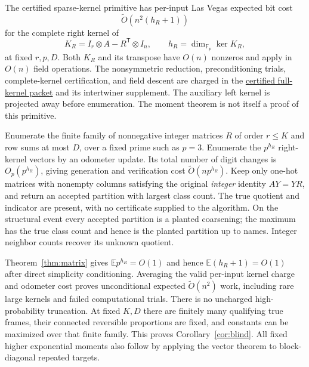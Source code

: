 \documentclass[11pt]{article}
\newcommand{\Fp}{\mathbb F_p}
\newcommand{\E}{\mathbb E}
\begin{document}
The certified sparse-kernel primitive has per-input Las Vegas expected bit cost
\[
 \widetilde O(n^2(h_R+1))
\]
for the complete right kernel of
\[
 K_R=I_r\otimes A-R^{\mathsf T}\otimes I_n,
 \qquad h_R=\dim_{\Fp}\ker K_R,
\]
at fixed $r,p,D$. Both $K_R$ and its transpose have $O(n)$ nonzeros and apply in $O(n)$ field operations. The nonsymmetric reduction, preconditioning trials, complete-kernel certification, and field descent are charged in the \href{../../../partitioning-dynamic-session/rsbm-full-kernel/certified-full-kernel.pdf}{certified full-kernel packet} and its intertwiner supplement. The auxiliary left kernel is projected away before enumeration. The moment theorem is not itself a proof of this primitive.

Enumerate the finite family of nonnegative integer matrices $R$ of order $r\le K$ and row sums at most $D$, over a fixed prime such as $p=3$. Enumerate the $p^{h_R}$ right-kernel vectors by an odometer update. Its total number of digit changes is $O_p(p^{h_R})$, giving generation and verification cost $\widetilde O(np^{h_R})$. Keep only one-hot matrices with nonempty columns satisfying the original \emph{integer} identity $AY=YR$, and return an accepted partition with largest class count. The true quotient and indicator are present, with no certificate supplied to the algorithm. On the structural event every accepted partition is a planted coarsening; the maximum has the true class count and hence is the planted partition up to names. Integer neighbor counts recover its unknown quotient.

Theorem~\ref{thm:matrix} gives $\E p^{h_R}=O(1)$ and hence $\E(h_R+1)=O(1)$ after direct simplicity conditioning. Averaging the valid per-input kernel charge and odometer cost proves unconditional expected $\widetilde O(n^2)$ work, including rare large kernels and failed computational trials. There is no uncharged high-probability truncation. At fixed $K,D$ there are finitely many qualifying true frames, their connected reversible proportions are fixed, and constants can be maximized over that finite family. This proves Corollary~\ref{cor:blind}. All fixed higher exponential moments also follow by applying the vector theorem to block-diagonal repeated targets.
\end{document}
